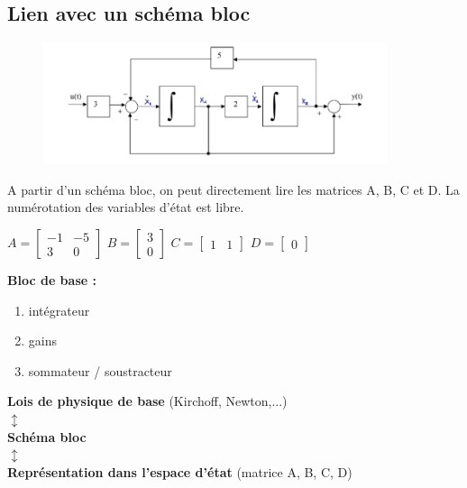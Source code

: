 \documentclass[document.tex]{subfiles}
\begin{document}
\subsection{Lien avec un schéma bloc}
\begin{figure}[H]
    \centering
    \includegraphics[width=0.9\textwidth]{Include/Figure/12.png}
\end{figure}

A partir d'un schéma bloc, on peut directement lire les matrices A, B, C et D.
La numérotation des variables d'état est libre.
\begin{center}
	$ A = \begin{bmatrix} -1 & -5 \\ 3 & 0 \end{bmatrix} $ \hfill
	$ B = \begin{bmatrix} 3 \\ 0 \end{bmatrix} $ \hfill
	$ C = \begin{bmatrix} 1 & 1 \end{bmatrix} $ \hfill
	$ D = \begin{bmatrix} 0 \end{bmatrix} $
\end{center}

\textbf{Bloc de base : }
\begin{enumerate}
\item intégrateur
\item gains
\item sommateur / soustracteur
\end{enumerate}

\begin{center}
\textbf{Lois de physique de base} (Kirchoff, Newton,...) \\
$ \updownarrow $ \\
\textbf{Schéma bloc} \\
$ \updownarrow $ \\
\textbf{Représentation dans l'espace d'état} (matrice A, B, C, D)
\end{center}
\end{document}
